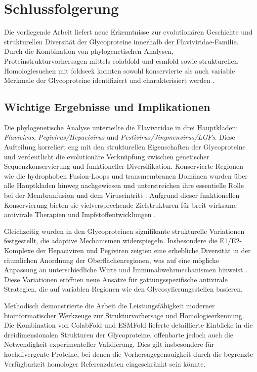 \chapter{Schlussfolgerung} \label{chap:schlussfolgerung}

Die vorliegende Arbeit liefert neue Erkenntnisse zur evolutionären Geschichte und strukturellen Diversität der Glycoproteine innerhalb der Flaviviridae-Familie. Durch die Kombination von phylogenetischen Analysen, Proteinstrukturvorhersagen mittels \gls{colabfold} und \gls{esmfold} sowie strukturellen Homologiesuchen mit \gls{foldseek} konnten sowohl konservierte als auch variable Merkmale der Glycoproteine identifiziert und charakterisiert werden \autocite{mifsudMappingGlycoproteinStructure2024}.

\section{Wichtige Ergebnisse und Implikationen} \label{sec:zusammenfassung-der-ergebnisse}

Die phylogenetische Analyse unterteilte die Flaviviridae in drei Hauptkladen: \textit{Flavivirus}, \textit{Pegivirus/Hepacivirus} und \textit{Pestivirus/Jingmenvirus/LGFs}. Diese Aufteilung korreliert eng mit den strukturellen Eigenschaften der Glycoproteine und verdeutlicht die evolutionäre Verknüpfung zwischen genetischer Sequenzkonservierung und funktioneller Diversifikation. Konservierte Regionen wie die hydrophoben Fusion-Loops und transmembranen Domänen wurden über alle Hauptkladen hinweg nachgewiesen und unterstreichen ihre essentielle Rolle bei der Membranfusion und dem Viruseintritt \autocite{Modis2004}. Aufgrund dieser funktionellen Konservierung bieten sie vielversprechende Zielstrukturen für breit wirksame antivirale Therapien und Impfstoffentwicklungen \autocite{Fernandez2018}.

Gleichzeitig wurden in den Glycoproteinen signifikante strukturelle Variationen festgestellt, die adaptive Mechanismen widerspiegeln. Insbesondere die E1/E2-Komplexe der Hepaciviren und Pegiviren zeigten eine erhebliche Diversität in der räumlichen Anordnung der Oberflächenregionen, was auf eine mögliche Anpassung an unterschiedliche Wirte und Immunabwehrmechanismen hinweist \autocite{Vieyres2013, Lavie2017}. Diese Variationen eröffnen neue Ansätze für gattungsspezifische antivirale Strategien, die auf variablen Regionen wie den Glycosylierungsstellen basieren.

Methodisch demonstrierte die Arbeit die Leistungsfähigkeit moderner bioinformatischer Werkzeuge zur Strukturvorhersage und Homologieerkennung. Die Kombination von ColabFold und ESMFold lieferte detaillierte Einblicke in die dreidimensionalen Strukturen der Glycoproteine, offenbarte jedoch auch die Notwendigkeit experimenteller Validierung. Dies gilt insbesondere für hochdivergente Proteine, bei denen die Vorhersagegenauigkeit durch die begrenzte Verfügbarkeit homologer Referenzdaten eingeschränkt sein könnte.

